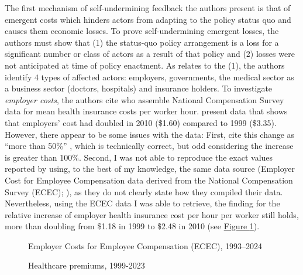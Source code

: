 \documentclass[11pt]{article}
\begin{document}
The first mechanism of self-undermining feedback the authors present is that of emergent costs which hinders actors from adapting to the policy status quo and causes them economic losses. To prove self-undermining emergent losses, the authors must show that (1) the status-quo policy arrangement is a loss for a significant number or class of actors as a result of that policy and (2) losses were not anticipated at time of policy enactment. As relates to the (1), the authors identify 4 types of affected actors: employers, governments, the medical sector as a business sector (doctors, hospitals) and insurance holders. To investigate \textit{employer costs}, the authors cite \textcite[][]{Claxton2011} who assemble National Compensation Survey data for mean health insurance costs per worker hour. \textcite[][]{Claxton2011} present data that shows that employers' cost had doubled in 2010 (\$1.60) compared to 1999 (\$3.35). However, there appear to be some issues with the data: First, \textcite[][]{Jacobs2014} cite this change as \enquote{more than 50\%} , which is technically correct, but odd considering the increase is greater than 100\%. Second, I was not able to reproduce the exact values reported by \textcite[][]{Claxton2011} using, to the best of my knowledge, the same data source (Employer Cost for Employee Compensation data derived from the National Compensation Survey (ECEC); ), as they do not clearly state how they compiled their data. Nevertheless, using the ECEC data I was able to retrieve, the finding for the relative increase of employer health insurance cost per hour per worker still holds, more than doubling from \$1.18 in 1999 to \$2.48 in 2010 (see \hyperref[fig:ecec]{Figure \ref*{fig:ecec}}).
\begin{figure}[!ht]
  \sffamily
  \caption{Employer Costs for Employee Compensation (ECEC), 1993--2024}
  
  \label{fig:ecec}
\end{figure}

\begin{figure}[!ht]
  \sffamily
  \caption{Healthcare premiums, 1999-2023}
  
  \label{fig:contr_prem}
\end{figure}
\end{document}
